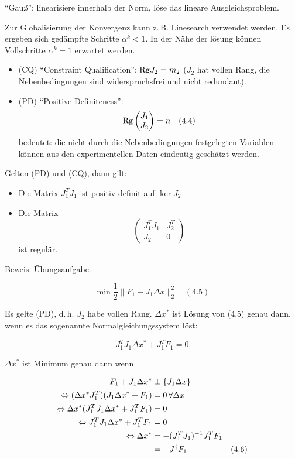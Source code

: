 "`Gauß"': linearisiere innerhalb der Norm, löse das lineare Ausgleichsproblem.


Zur Globalisierung der Konvergenz kann z.\,B. Linesearch verwendet werden. Es ergeben sich gedämpfte Schritte $\alpha^k < 1$. In der Nähe der lösung können Vollschritte $\alpha^k=1$ erwartet werden.


\begin{itemize}
\item (CQ) "`Constraint Qualification"': $\mathrm{Rg} J_2 = m_2$ ($J_2$ hat vollen Rang, die Nebenbedingungen sind widerspruchsfrei und nicht redundant).
\item (PD) "`Positive Definiteness"':
\[ \mathrm{Rg} \begin{pmatrix} J_1 \\ J_2 \end{pmatrix} = n \quad (4.4)\]
bedeutet: die nicht durch die Nebenbedingungen festgelegten Variablen können aus den experimentellen Daten eindeutig geschätzt werden.
\end{itemize}


Gelten (PD) und (CQ), dann gilt:

\begin{itemize}
\item Die Matrix $J_1^T J_1$ ist positiv definit auf $\ker J_2$
\item Die Matrix
\[ \begin{pmatrix} J_1^T J_1 & J_2^T \\ J_2 & 0 \end{pmatrix} \]
ist regulär.
\end{itemize}

Beweis: Übungsaufgabe.



\[ \min \frac 12 \| F_1 + J_1 \Delta x \|_2^2 \quad (4.5) \]

Es gelte (PD), d.\,h. $J_2$ habe vollen Rang. $\Delta x^*$ ist Lösung von (4.5) genau dann, wenn es das sogenannte Normalgleichungssystem löst:

\[ J_1^T J_1 \Delta x^* + J_1^T F_1 = 0 \]

$\Delta x^*$ ist Minimum genau dann wenn 

\begin{align*}
F_1 + J_1 \Delta x^* &\perp \{ J_1 \Delta x\}\\
\Leftrightarrow (\Delta x^* J_1^T)(J_1 \Delta x^* + F_1) &= 0 \, \forall \Delta x \\
\Leftrightarrow \Delta x^* (J_1^T J_1 \Delta x^* + J_1^T F_1) &= 0 \\
\Leftrightarrow J_1^T J_1 \Delta x^* + J_1^T F_1 &= 0\\
\Leftrightarrow \Delta x^* &= - (J_1^T J_1)^{-1} J_1^T F_1 \\
&= - J^\dagger F_1 & (4.6)
\end{align*}

